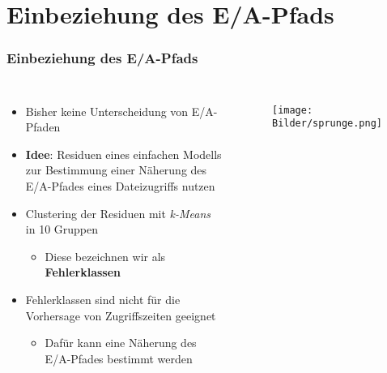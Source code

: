 \documentclass{beamer}
\begin{document}
\section{Einbeziehung des E/A-Pfads}
\begin{frame}
\frametitle{Einbeziehung des E/A-Pfads}
\begin{columns}
\begin{itemize}
	\item Bisher keine Unterscheidung von E/A-Pfaden
	\item \textbf{Idee}: Residuen eines einfachen Modells zur Bestimmung einer Näherung des E/A-Pfades eines Dateizugriffs nutzen
	\item Clustering der Residuen mit \textit{k-Means} in 10 Gruppen
	\begin{itemize}
		\item Diese bezeichnen wir als \textbf{Fehlerklassen} 
	\end{itemize}
	\item Fehlerklassen sind nicht für die Vorhersage von Zugriffszeiten geeignet
	\begin{itemize}
		\item Dafür kann eine Näherung des E/A-Pfades bestimmt werden
	\end{itemize}
\end{itemize}
	\begin{figure}
		\texttt{[image: Bilder/sprunge.png]}\\
	\end{figure}
\end{columns}
\end{frame}
\end{document}
